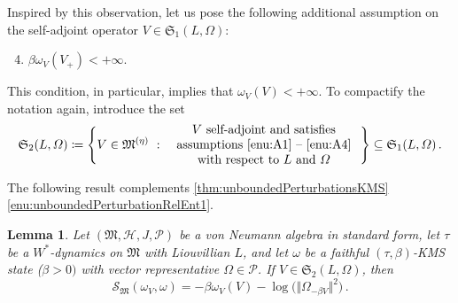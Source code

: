 \documentclass[a4paper, twoside, 11pt, reqno]{amsart}
\theoremstyle{definition}
\theoremstyle{plain}
\newtheorem{lemma}[definition]{Lemma}
\renewcommand{\subset}{\subseteq}
\let\originalleft\left
\let\originalright\right
\renewcommand{\left}{\mathopen{}\mathclose\bgroup\originalleft}
\renewcommand{\right}{\aftergroup\egroup\originalright}
\renewcommand{\Omega}{\varOmega}
\newcommand{\MH}{\mathcal{H}}
\newcommand{\MS}{\mathcal{S}}
\newcommand{\MFM}{\mathfrak{M}}
\newcommand{\MFS}{\mathfrak{S}}
\newcommand{\NPC}{\mathcal{P}}
\renewcommand{\AE}[1]{#1^{(\eta)}}
\newcommand{\1}{\mathbf{1}}
\newcommand{\norm}[2][]{#1\Vert{#2}#1\Vert}
\newcommand{\ce}{\coloneqq}
\begin{document}
Inspired by this observation, let us pose the following additional assumption on the self-adjoint operator $V \in \MFS_1(L, \Omega)$:
\begin{enumerate}[label=\normalfont\bfseries(A\arabic*), ref=\normalfont(A\arabic*)]
    \setcounter{enumi}{3}
    \item \label{enu:A4} $\beta \omega_V(V_+) < + \infty$.
\end{enumerate}
This condition, in particular, implies that $\omega_V(V) < + \infty$. To compactify the notation again, introduce the set
\begin{equation*}
    \MFS_2(L, \Omega) \ce \left\{V \in \AE{\MFM} \ : \ \parbox{0.45\textwidth}{\centering $V$ self-adjoint and satisfies assumptions \ref{enu:A1} -- \ref{enu:A4} with respect to $L$ and $\Omega$}\right\} \subset \MFS_1(L, \Omega) \, .
\end{equation*}

The following result complements \cref{thm:unboundedPerturbationsKMS} \ref{enu:unboundedPerturbationRelEnt1}.

\begin{lemma}\label{lem:unboundedPerturbationRelEnt2}
    Let $(\MFM, \MH, J, \NPC)$ be a von Neumann algebra in standard form, let $\tau$ be a $W^\ast$-dynamics on $\MFM$ with Liouvillian $L$, and let $\omega$ be a faithful $(\tau, \beta)$-KMS state ($\beta > 0)$ with vector representative $\Omega \in \NPC$. If $V \in \MFS_2(L, \Omega)$, then
    \begin{equation*}
        \MS_\MFM(\omega_V, \omega) = - \beta \omega_V(V) - \log \bigl(\norm{\Omega_{- \beta V}}^2\bigr) \, .
    \end{equation*}
\end{lemma}
\end{document}
